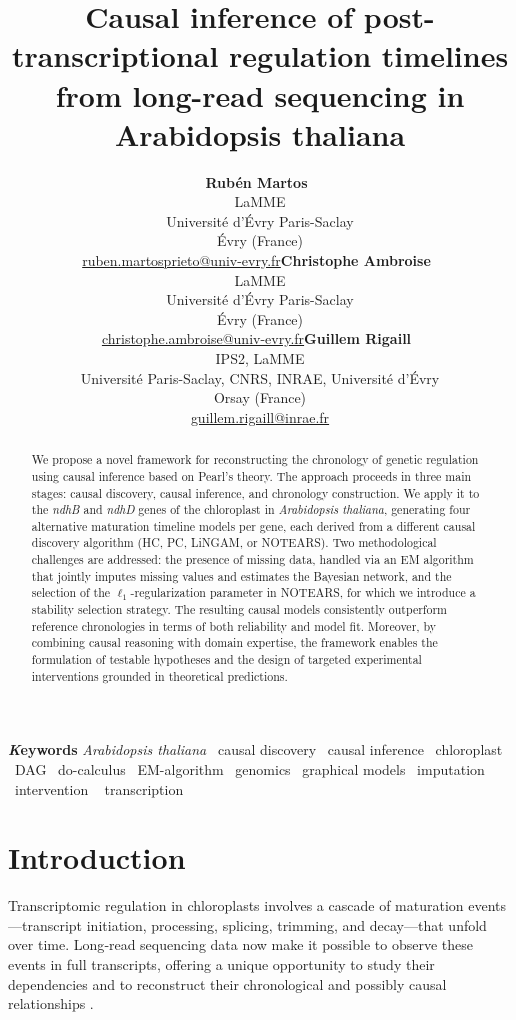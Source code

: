 \documentclass[
]{article}
\title{Causal inference of post-transcriptional regulation timelines
from long-read sequencing in Arabidopsis thaliana}
\author{\textbf{Rubén
Martos}~\orcidlink{https://orcid.org/0000-0002-1463-5088}\\LaMME\\Université
d'Évry
Paris-Saclay\\Évry  (France)\\\href{mailto:ruben.martosprieto@univ-evry.fr}{ruben.martosprieto@univ-evry.fr}\asep\textbf{Christophe
Ambroise}~\orcidlink{https://orcid.org/0000-0002-8148-0346}\\LaMME\\Université
d'Évry
Paris-Saclay\\Évry  (France)\\\href{mailto:christophe.ambroise@univ-evry.fr}{christophe.ambroise@univ-evry.fr}\asep\textbf{Guillem
Rigaill}~\orcidlink{https://orcid.org/0000-0002-7176-7511}\\IPS2,
LaMME\\Université Paris-Saclay, CNRS, INRAE, Université
d'Évry\\Orsay  (France)\\\href{mailto:guillem.rigaill@inrae.fr}{guillem.rigaill@inrae.fr}}
\date{}
\renewcommand*\contentsname{Table of contents}
\newcommand\contentsname{Table of contents}
\theoremstyle{definition}
\theoremstyle{remark}
\begin{document}
\maketitle
\begin{abstract}
We propose a novel framework for reconstructing the chronology of
genetic regulation using causal inference based on Pearl's theory. The
approach proceeds in three main stages: causal discovery, causal
inference, and chronology construction. We apply it to the \emph{ndhB}
and \emph{ndhD} genes of the chloroplast in \emph{Arabidopsis thaliana},
generating four alternative maturation timeline models per gene, each
derived from a different causal discovery algorithm (HC, PC, LiNGAM, or
NOTEARS). Two methodological challenges are addressed: the presence of
missing data, handled via an EM algorithm that jointly imputes missing
values and estimates the Bayesian network, and the selection of the
\(\ell_1\)-regularization parameter in NOTEARS, for which we introduce a
stability selection strategy. The resulting causal models consistently
outperform reference chronologies in terms of both reliability and model
fit. Moreover, by combining causal reasoning with domain expertise, the
framework enables the formulation of testable hypotheses and the design
of targeted experimental interventions grounded in theoretical
predictions.
\end{abstract}
{\bfseries \emph Keywords}
\def\sep{\textbullet\ }
\emph{Arabidopsis thaliana} \sep causal discovery \sep causal
inference \sep chloroplast \sep DAG \sep do-calculus \sep EM-algorithm \sep genomics \sep graphical
models \sep imputation \sep intervention \sep 
transcription


\renewcommand*\contentsname{Table of contents}
{
\hypersetup{linkcolor=}
\setcounter{tocdepth}{3}
\tableofcontents
}

\newpage{}

\section{Introduction}\label{sec-intro}

Transcriptomic regulation in chloroplasts involves a cascade of
maturation events---transcript initiation, processing, splicing,
trimming, and decay---that unfold over time. Long‑read sequencing data
now make it possible to observe these events in full transcripts,
offering a unique opportunity to study their dependencies and to
reconstruct their chronological and possibly causal relationships
.
\end{document}
